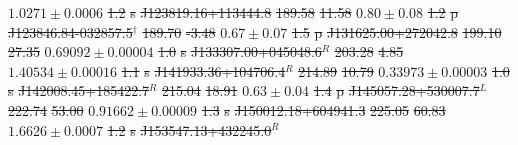 \documentclass[11pt, a4paper]{book}
\providecommand{\DIFdeltex}[1]{{\protect\color{red}\sout{#1}}}                      %
\providecommand{\DIFdelFL}[1]{\DIFdel{#1}} %
\providecommand{\DIFdel}[1]{\texorpdfstring{\DIFdeltex{#1}}{}} %
\begin{document}
\DIFdelFL{$1.0271 \pm 0.0006$ }%
\DIFdelFL{1.2 }%
\DIFdelFL{s}%
    \DIFdelFL{J123819.16+113444.8 }%
\DIFdelFL{189.58 }%
\DIFdelFL{11.58 }%
\DIFdelFL{$0.80 \pm 0.08$ }%
\DIFdelFL{1.2 }%
\DIFdelFL{p}%
    \DIFdelFL{J123846.84-032857.5${}^\dagger$ }%
\DIFdelFL{189.70 }%
\DIFdelFL{-3.48 }%
\DIFdelFL{$0.67 \pm 0.07$ }%
\DIFdelFL{1.5 }%
\DIFdelFL{p}%
    \DIFdelFL{J131625.00+272042.8 }%
\DIFdelFL{199.10 }%
\DIFdelFL{27.35 }%
\DIFdelFL{$0.69092 \pm 0.00004$ }%
\DIFdelFL{1.0 }%
\DIFdelFL{s}%
    \DIFdelFL{J133307.00+045048.6${}^R$ }%
\DIFdelFL{203.28 }%
\DIFdelFL{4.85 }%
\DIFdelFL{$1.40534 \pm 0.00016$ }%
\DIFdelFL{1.1 }%
\DIFdelFL{s}%
    \DIFdelFL{J141933.36+104706.4${}^R$ }%
\DIFdelFL{214.89 }%
\DIFdelFL{10.79 }%
\DIFdelFL{$0.33973 \pm 0.00003$ }%
\DIFdelFL{1.0 }%
\DIFdelFL{s}%
    \DIFdelFL{J142008.45+185422.7${}^R$ }%
\DIFdelFL{215.04 }%
\DIFdelFL{18.91 }%
\DIFdelFL{$0.63 \pm 0.04$ }%
\DIFdelFL{1.4 }%
\DIFdelFL{p}%
    \DIFdelFL{J145057.28+530007.7${}^L$ }%
\DIFdelFL{222.74 }%
\DIFdelFL{53.00 }%
\DIFdelFL{$0.91662 \pm 0.00009$ }%
\DIFdelFL{1.3 }%
\DIFdelFL{s}%
    \DIFdelFL{J150012.18+604941.3 }%
\DIFdelFL{225.05 }%
\DIFdelFL{60.83 }%
\DIFdelFL{$1.6626 \pm 0.0007$ }%
\DIFdelFL{1.2 }%
\DIFdelFL{s}%
    \DIFdelFL{J153547.13+432245.0${}^R$ }%
\end{document}
